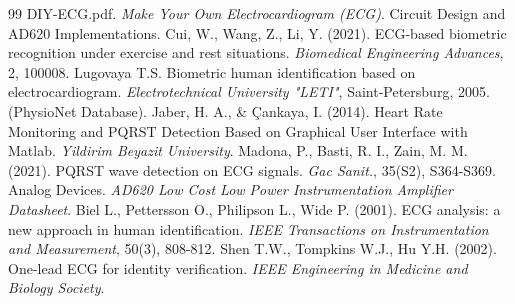 \documentclass[12pt,a4paper]{report}
\begin{document}
\newpage
\renewcommand{\bibname}{\fontsize{16}{19}\selectfont BIBLIOGRAPHY} 


\begin{thebibliography}{99}
 DIY-ECG.pdf. \textit{Make Your Own Electrocardiogram (ECG)}. Circuit Design and AD620 Implementations.
 Cui, W., Wang, Z., Li, Y. (2021). ECG-based biometric recognition under exercise and rest situations. \textit{Biomedical Engineering Advances}, 2, 100008.
 Lugovaya T.S. Biometric human identification based on electrocardiogram. \textit{Electrotechnical University "LETI"}, Saint-Petersburg, 2005. (PhysioNet Database).
 Jaber, H. A., \& \c{C}ankaya, I. (2014). Heart Rate Monitoring and PQRST Detection Based on Graphical User Interface with Matlab. \textit{Yildirim Beyazit University}.
 Madona, P., Basti, R. I., Zain, M. M. (2021). PQRST wave detection on ECG signals. \textit{Gac Sanit.}, 35(S2), S364-S369.
 Analog Devices. \textit{AD620 Low Cost Low Power Instrumentation Amplifier Datasheet}.
 Biel L., Pettersson O., Philipson L., Wide P. (2001). ECG analysis: a new approach in human identification. \textit{IEEE Transactions on Instrumentation and Measurement}, 50(3), 808-812.
 Shen T.W., Tompkins W.J., Hu Y.H. (2002). One-lead ECG for identity verification. \textit{IEEE Engineering in Medicine and Biology Society}.
\end{thebibliography}
\end{document}
